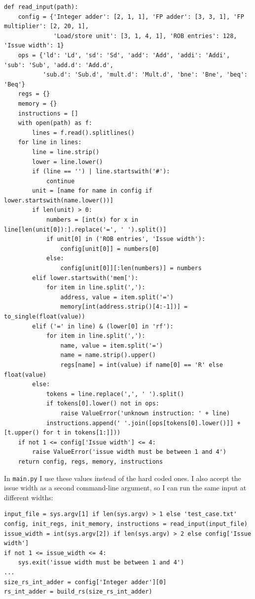 \documentclass[11pt]{article}
\renewcommand{\_}{\origunderscore\allowbreak}
\begin{document}
\begin{lstlisting}
def read_input(path):
    config = {'Integer adder': [2, 1, 1], 'FP adder': [3, 3, 1], 'FP multiplier': [2, 20, 1],
              'Load/store unit': [3, 1, 4, 1], 'ROB entries': 128, 'Issue width': 1}
    ops = {'ld': 'Ld', 'sd': 'Sd', 'add': 'Add', 'addi': 'Addi', 'sub': 'Sub', 'add.d': 'Add.d',
           'sub.d': 'Sub.d', 'mult.d': 'Mult.d', 'bne': 'Bne', 'beq': 'Beq'}
    regs = {}
    memory = {}
    instructions = []
    with open(path) as f:
        lines = f.read().splitlines()
    for line in lines:
        line = line.strip()
        lower = line.lower()
        if (line == '') | line.startswith('#'):
            continue
        unit = [name for name in config if lower.startswith(name.lower())]
        if len(unit) > 0:
            numbers = [int(x) for x in line[len(unit[0]):].replace('=', ' ').split()]
            if unit[0] in ('ROB entries', 'Issue width'):
                config[unit[0]] = numbers[0]
            else:
                config[unit[0]][:len(numbers)] = numbers
        elif lower.startswith('mem['):
            for item in line.split(','):
                address, value = item.split('=')
                memory[int(address.strip()[4:-1])] = to_single(float(value))
        elif ('=' in line) & (lower[0] in 'rf'):
            for item in line.split(','):
                name, value = item.split('=')
                name = name.strip().upper()
                regs[name] = int(value) if name[0] == 'R' else float(value)
        else:
            tokens = line.replace(',', ' ').split()
            if tokens[0].lower() not in ops:
                raise ValueError('unknown instruction: ' + line)
            instructions.append(' '.join([ops[tokens[0].lower()]] + [t.upper() for t in tokens[1:]]))
    if not 1 <= config['Issue width'] <= 4:
        raise ValueError('issue width must be between 1 and 4')
    return config, regs, memory, instructions
\end{lstlisting}

In \texttt{main.py} I use these values instead of the hard coded ones. I also accept the issue
width as a second command-line argument, so I can run the same input at different widths:

\begin{lstlisting}
input_file = sys.argv[1] if len(sys.argv) > 1 else 'test_case.txt'
config, init_regs, init_memory, instructions = read_input(input_file)
issue_width = int(sys.argv[2]) if len(sys.argv) > 2 else config['Issue width']
if not 1 <= issue_width <= 4:
    sys.exit('issue width must be between 1 and 4')
...
size_rs_int_adder = config['Integer adder'][0]
rs_int_adder = build_rs(size_rs_int_adder)
\end{lstlisting}
\end{document}

